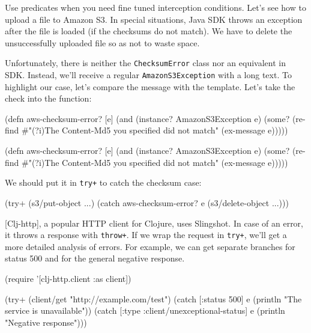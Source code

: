 
Use predicates when you need fine tuned interception conditions. Let's see how to upload a file to Amazon S3. In special situations, Java SDK throws an exception after the file is loaded (if the checksums do not match). We have to delete the unsuccessfully uploaded file so as not to waste space.

Unfortunately, there is neither the \verb|ChecksumError| class nor an equivalent in SDK. Instead, we'll receive a regular \verb|AmazonS3Exception| with a long text. To highlight our case, let's compare the message with the template. Let's take the check into the function:

\ifx\DEVICETYPE\MOBILE

\begin{clojure}
(defn aws-checksum-error? [e]
  (and
    (instance? AmazonS3Exception e)
    (some?
      (re-find
        #"(?i)The Content-Md5
            you specified did not match"
        (ex-message e)))))
\end{clojure}

\else

\begin{clojure}
(defn aws-checksum-error? [e]
  (and (instance? AmazonS3Exception e)
       (some?
        (re-find
         #"(?i)The Content-Md5 you specified did not match"
         (ex-message e)))))
\end{clojure}

\fi

\noindent
We should put it in \verb|try+| to catch the checksum case:

\begin{clojure}
(try+
  (s3/put-object ...)
  (catch aws-checksum-error? e
    (s3/delete-object ...)))
\end{clojure}

[Clj-http], a popular HTTP client for Clojure, uses Slingshot. In case of an error, it throws a response with \verb|throw+|. If we wrap the request in \verb|try+|, we'll get a more detailed analysis of errors. For example, we can get separate branches for status 500 and for the general negative response.

\ifx\DEVICETYPE\MOBILE

\begin{clojure}
(require '[clj-http.client :as client])

(try+
 (client/get "http://example.com/test")
 (catch [:status 500] e
  (println "The service is unavailable"))
 (catch
  [:type :client/unexceptional-status] e
  (println "Negative response")))
\end{clojure}

